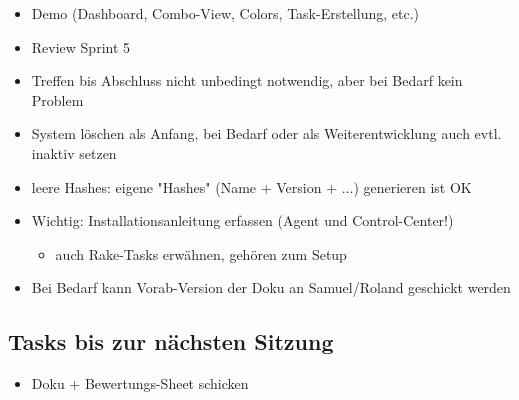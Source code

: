 \documentclass[class=scrbook,crop=false]{standalone}
\begin{document}
	\begin{itemize}
        \item Demo (Dashboard, Combo-View, Colors, Task-Erstellung, etc.)
        \item Review Sprint 5
        \item Treffen bis Abschluss nicht unbedingt notwendig, aber bei Bedarf kein Problem
        \item System löschen als Anfang, bei Bedarf oder als Weiterentwicklung auch evtl. inaktiv setzen
        \item leere Hashes: eigene "Hashes" (Name + Version + ...) generieren ist OK
        \item Wichtig: Installationsanleitung erfassen (Agent und Control-Center!)
        \begin{itemize}
            \item auch Rake-Tasks erwähnen, gehören zum Setup
        \end{itemize}
        \item Bei Bedarf kann Vorab-Version der Doku an Samuel/Roland geschickt werden
    \end{itemize}
    
    \subsection*{Tasks bis zur nächsten Sitzung}
    
    \begin{itemize}
        \item Doku + Bewertungs-Sheet schicken
    \end{itemize}
\end{document}
